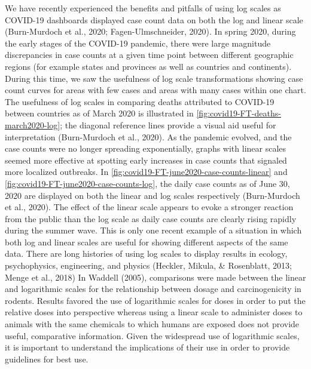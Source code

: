 \documentclass[print]{nuthesis}
\begin{document}
We have recently experienced the benefits and pitfalls of using log scales as COVID-19 dashboards displayed
case count data on both the log and linear scale (Burn-Murdoch et al., 2020; Fagen-Ulmschneider, 2020).
In spring 2020, during the early stages of the COVID-19 pandemic, there were large magnitude discrepancies in case counts at a given time point between different geographic regions (for example states and provinces as well as countries and continents).
During this time, we saw the usefulness of log scale transformations showing case count curves for areas with few cases and areas with many cases within one chart.
The usefulness of log scales in comparing deaths attributed to COVID-19 between countries as of March 2020 is illustrated in \cref{fig:covid19-FT-deaths-march2020-log}; the diagonal reference lines provide a visual aid useful for interpretation (Burn-Murdoch et al., 2020).
As the pandemic evolved, and the case counts were no longer spreading exponentially, graphs with linear scales seemed more effective at spotting early increases in case counts that signaled more localized outbreaks. In \cref{fig:covid19-FT-june2020-case-counts-linear} and \cref{fig:covid19-FT-june2020-case-counts-log}, the daily case counts as of June 30, 2020 are displayed on both the linear and log scales respectively (Burn-Murdoch et al., 2020).
The effect of the linear scale  appears to evoke a stronger reaction from the public than the log scale  as daily case counts are clearly rising rapidly during the summer wave.
This is only one recent example of a situation in which both log and linear scales are useful for showing different aspects of the same data.
There are long histories of using log scales to display results in ecology, psychophysics, engineering, and physics (Heckler, Mikula, \& Rosenblatt, 2013; Menge et al., 2018)
In Waddell (2005), comparisons were made between the linear and logarithmic scales for the relationship between dosage and carcinogenicity in rodents.
Results favored the use of logarithmic scales for doses in order to put the relative doses into perspective whereas using a linear scale to administer doses to animals with the same chemicals to which humans are exposed does not provide useful, comparative information.
Given the widespread use of logarithmic scales, it is important to understand the implications of their use in order to provide guidelines for best use.
\end{document}
